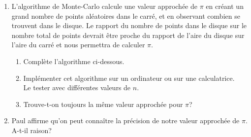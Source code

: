 \begin{TP}
\begin{enumerate}
\begin{enumerate}
\begin{center}
\end{center}
	\end{enumerate}
	\vspace{-1.5em}
\item L'algorithme de Monte-Carlo calcule une valeur approchée de $\pi$ en créant un grand nombre de points aléatoires dans le carré, et en observant combien se trouvent dans le disque. Le rapport du nombre de points dans le disque sur le nombre total de points devrait être proche du rapport de l'aire du disque sur l'aire du carré et nous permettra de calculer $\pi$.
	\begin{enumerate}
	\item Complète l'algorithme ci-dessous.
	{\small
 \begin{center}
\begin{algorithme}
\BLOCKvariables
{}
\BLOCKtraitements
{}
\BLOCKaffichage
{}
\finAlgo
        \end{algorithme}
\end{center}}
	\item Implémenter cet algorithme sur un ordinateur ou sur une calculatrice.\\
	 Le tester avec différentes valeurs de $n$.
	\item Trouve-t-on toujours la même valeur approchée pour $\pi$?
	\end{enumerate}
\item Paul affirme qu'on peut connaître la précision de notre valeur approchée de $\pi$. A-t-il raison?
\end{enumerate}

\end{TP}




